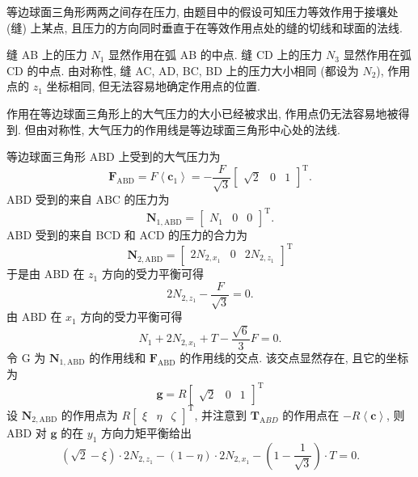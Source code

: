 \documentclass{article}
\begin{document}
等边球面三角形两两之间存在压力, 由题目中的假设可知压力等效作用于接壤处 (缝) 上某点,
且压力的方向同时垂直于在等效作用点处的缝的切线和球面的法线.

缝 AB 上的压力 $N_1$ 显然作用在弧 AB 的中点.
缝 CD 上的压力 $N_3$ 显然作用在弧 CD 的中点.
由对称性, 缝 AC, AD, BC, BD 上的压力大小相同 (都设为 $N_2$), 作用点的 $z_1$ 坐标相同,
但无法容易地确定作用点的位置.

作用在等边球面三角形上的大气压力的大小已经被求出, 作用点仍无法容易地被得到.
但由对称性, 大气压力的作用线是等边球面三角形中心处的法线.

等边球面三角形 ABD 上受到的大气压力为
\begin{equation}
	\mathbf F_{\mathrm{ABD}}=F\left<\mathbf c_1\right>=
	-\frac F{\sqrt3}\left[\begin{matrix}\sqrt2 & 0 & 1\end{matrix}\right]^\mathrm T.
\end{equation}
ABD 受到的来自 ABC 的压力为
\begin{equation}
	\mathbf N_{1,\mathrm{ABD}}=\left[\begin{matrix}N_1 & 0 & 0\end{matrix}\right]^\mathrm T.
\end{equation}
ABD 受到的来自 BCD 和 ACD 的压力的合力为
\begin{equation}
	\mathbf N_{2,\mathrm{ABD}}=\left[\begin{matrix}2N_{2,x_1} & 0 & 2N_{2,z_1}\end{matrix}\right]^\mathrm T
\end{equation}
于是由 ABD 在 $z_1$ 方向的受力平衡可得
\begin{equation}
	2N_{2,z_1}-\frac F{\sqrt3}=0.
	\label{eq:z1受力平衡}
\end{equation}
由 ABD 在 $x_1$ 方向的受力平衡可得
\begin{equation}
	N_1+2N_{2,x_1}+T-\frac{\sqrt6}3F=0.
	\label{eq:x1受力平衡}
\end{equation}
令 G 为 $\mathbf N_{1,\mathrm{ABD}}$ 的作用线和 $\mathbf F_{\mathrm{ABD}}$ 的作用线的交点.
该交点显然存在, 且它的坐标为
\begin{equation}
	\mathbf g=R\left[\begin{matrix}\sqrt2 & 0 & 1\end{matrix}\right]^\mathrm T
\end{equation}
设 $\mathbf N_{2,\mathrm{ABD}}$ 的作用点为
$R\left[\begin{matrix}\xi & \eta & \zeta\end{matrix}\right]^\mathrm T$,
并注意到 $\mathbf T_{\mathrm ABD}$ 的作用点在 $-R\left<\mathbf c\right>$,
则 ABD 对 $\mathbf g$ 的在 $y_1$ 方向力矩平衡给出
\begin{equation}
	\left(\sqrt2-\xi\right)\cdot2N_{2,z_1}-\left(1-\eta\right)\cdot2N_{2,x_1}-\left(1-\frac1{\sqrt3}\right)\cdot T=0.
	\label{eq:y1受力矩平衡}
\end{equation}
\end{document}
